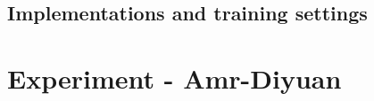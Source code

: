\documentclass[pmlr]{jmlr}%
\begin{document}

\subsection{Implementations and training settings}
















\section{Experiment - Amr-Diyuan}
\end{document}

